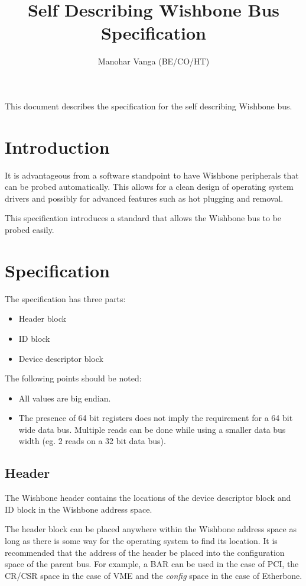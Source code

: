 \documentclass{article}
\title{Self Describing Wishbone Bus Specification}
\author{Manohar Vanga (BE/CO/HT)}
\begin{document}
\maketitle

This document describes the specification for the self describing Wishbone
bus.

\section{Introduction}

It is advantageous from a software standpoint to have Wishbone peripherals
that can be probed automatically. This allows for a clean design of operating
system drivers and possibly for advanced features such as hot plugging and 
removal.

This specification introduces a standard that allows the Wishbone bus to be
probed easily.

\section{Specification}

The specification has three parts:

\begin{itemize}
\item Header block
\item ID block
\item Device descriptor block
\end{itemize}

The following points should be noted:

\begin{itemize}
\item All values are big endian.
\item The presence of 64 bit registers does not imply the requirement for a
64 bit wide data bus. Multiple reads can be done while using a smaller data
bus width (eg. 2 reads on a 32 bit data bus).
\end{itemize}

\subsection{Header}

The Wishbone header contains the locations of the device descriptor block and 
ID block in the Wishbone address space.

The header block can be placed anywhere within the Wishbone address space
as long as there is some way for the operating system to find its location.
It is recommended that the address of the header be placed into the configuration
space of the parent bus. For example, a BAR can be used in the case of PCI,
the CR/CSR space in the case of VME and the \emph{config} space in the case
of Etherbone.
\end{document}
